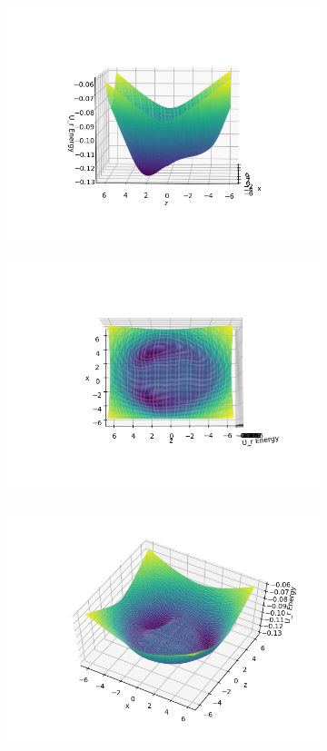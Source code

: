 \documentclass[..Thesis.tex]{subfiles}
\begin{document}
\begin{figure}[h!]
\begin{subfigure}[b]{0.49\linewidth}
    \includegraphics[width=\linewidth]{img/Urpot3.png}
  \end{subfigure}
  \begin{subfigure}[b]{0.49\linewidth}
    \includegraphics[width=\linewidth]{img/Urpot4.png}
  \end{subfigure}
  \begin{subfigure}[b]{\linewidth}
    \includegraphics[width=\linewidth]{img/Urpot1.png}

\end{subfigure}
\end{figure}
\end{document}
